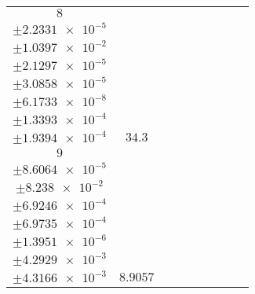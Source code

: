 \documentclass[8pt]{article}
\begin{document}
\begin{longtable}[l]{c c c c c c c c c}
$\num{8}$ & \begin{tabular}[c]{@{}c@{}}$\num{0.12288}$ \\ $\pm\num{2.2331e-5}$\end{tabular} & \begin{tabular}[c]{@{}c@{}}$\num{-0.3631}$ \\ $\pm\num{1.0397e-2}$\end{tabular} & \begin{tabular}[c]{@{}c@{}}$\num{5.2045}$ \\ $\pm\num{2.1297e-5}$\end{tabular} & \begin{tabular}[c]{@{}c@{}}$\num{1.9346e+3}$ \\ $\pm\num{3.0858e-5}$\end{tabular} & \begin{tabular}[c]{@{}c@{}}$\num{3.8704}$ \\ $\pm\num{6.1733e-8}$\end{tabular} & \begin{tabular}[c]{@{}c@{}}$\num{0.47318}$ \\ $\pm\num{1.3393e-4}$\end{tabular} & \begin{tabular}[c]{@{}c@{}}$\num{0.47289}$ \\ $\pm\num{1.9394e-4}$\end{tabular} & $\num{34.3}$\\
$\num{9}$ & \begin{tabular}[c]{@{}c@{}}$\num{6.0757e-2}$ \\ $\pm\num{8.6064e-5}$\end{tabular} & \begin{tabular}[c]{@{}c@{}}$\num{0.36711}$ \\ $\pm\num{8.238e-2}$\end{tabular} & \begin{tabular}[c]{@{}c@{}}$\num{-3.3294}$ \\ $\pm\num{6.9246e-4}$\end{tabular} & \begin{tabular}[c]{@{}c@{}}$\num{1.9776e+3}$ \\ $\pm\num{6.9735e-4}$\end{tabular} & \begin{tabular}[c]{@{}c@{}}$\num{3.9563}$ \\ $\pm\num{1.3951e-6}$\end{tabular} & \begin{tabular}[c]{@{}c@{}}$\num{2.6421}$ \\ $\pm\num{4.2929e-3}$\end{tabular} & \begin{tabular}[c]{@{}c@{}}$\num{2.6425}$ \\ $\pm\num{4.3166e-3}$\end{tabular} & $\num{8.9057}$\\

\end{longtable}
\end{document}
